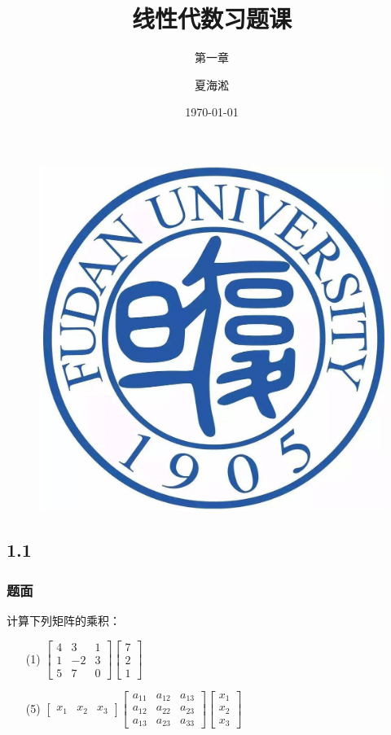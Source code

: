 \documentclass{beamer}
\author{夏海淞}
\title{线性代数习题课}
\subtitle{第一章}
\date{\today}
\begin{document}
\setlength{\parskip}{0.45\baselineskip}
\begin{frame}
    \titlepage
    \begin{figure}[htpb]
        \begin{center}
            \vspace*{-0.5cm}
            \includegraphics[width=0.1\linewidth]{pic/FDU.jpeg}
        \end{center}
    \end{figure}

\end{frame}


\subsection*{1.1}

\begin{frame}
\frametitle{题面}

计算下列矩阵的乘积：

\begin{enumerate}
    \item[(1)] \(\begin{bmatrix}
            4 & 3 & 1 \\1&-2&3\\5&7&0
        \end{bmatrix}\begin{bmatrix}
            7 \\2\\1
        \end{bmatrix}\)
    \item[(5)] \(\begin{bmatrix}
            x_1 & x_2 & x_3
        \end{bmatrix}
        \begin{bmatrix}
            a_{11} & a_{12} & a_{13} \\
            a_{12} & a_{22} & a_{23} \\
            a_{13} & a_{23} & a_{33}
        \end{bmatrix}
        \begin{bmatrix}
            x_1 \\x_2\\x_3
        \end{bmatrix}\)
\end{enumerate}

\end{frame}
\end{document}
